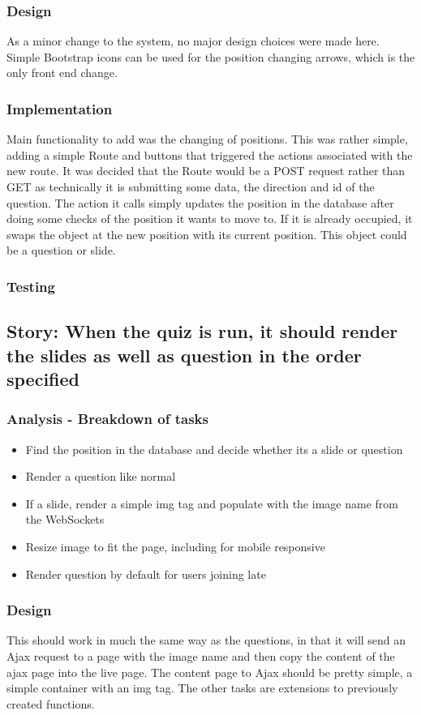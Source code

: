 \subsubsection{Design}
As a minor change to the system, no major design choices were made here. Simple Bootstrap icons can be used for the position changing arrows, which is the only front end change. 
\subsubsection{Implementation}
Main functionality to add was the changing of positions. This was rather simple, adding a simple Route and buttons that triggered the actions associated with the new route. It was decided that the Route would be a POST request rather than GET as technically it is submitting some data, the direction and id of the question. The action it calls simply updates the position in the database after doing some checks of the position it wants to move to. If it is already occupied, it swaps the object at the new position with its current position. This object could be a question or slide.   
\subsubsection{Testing}
\newpage

\subsection{Story: When the quiz is run, it should render the slides as well as question in the order specified}
\subsubsection{Analysis - Breakdown of tasks}
\begin{itemize}
	\item Find the position in the database and decide whether its a slide or question
	\item Render a question like normal
	\item If a slide, render a simple img tag and populate with the image name from the WebSockets
	\item Resize image to fit the page, including for mobile responsive
	\item Render question by default for users joining late
\end{itemize}
\subsubsection{Design}
This should work in much the same way as the questions, in that it will send an Ajax request to a page with the image name and then copy the content of the ajax page into the live page. The content page to Ajax should be pretty simple, a simple container with an img tag. The other tasks are extensions to previously created functions.
